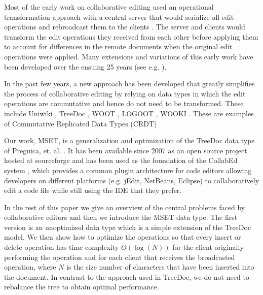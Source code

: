 \documentclass{amsart}
\begin{document}
Most of the early work on collaborative editing used an operational transformation approach with a central server that would serialize all edit operations  and rebroadcast them to the clients \cite{nichols_high-latency_1995}. The server and clients would transform the edit operations they received from each other before applying them to account for differences in the remote documents when the original edit operations were applied. Many extensions and variations of this early work have been developed over the ensuing 25 years (see e.g. \cite{sun_operational_2004}).

In the past few years, a new approach has been developed that greatly simplifies the process of collaborative editing by relying on data types in which the edit operations are commutative and hence do not need to be transformed. These include Uniwiki \cite{oster_building_2010, oster_uniwiki:_2009},  TreeDoc \cite{ letia_consistency_2010, preguica_commutative_2009}, WOOT \cite{oster_data_2006}, LOGOOT \cite{weiss_logoot:_2008, weiss_logoot:_2009, weiss_logoot-undo:_2010}, WOOKI \cite{weiss_wooki:_2007}. These are examples of Commutative Replicated Data Types (CRDT) \cite{preguica_commutative_2009}

Our work, MSET, is a generalization and optimization of the TreeDoc data type  of Preguica, et. al.  \cite{preguica_commutative_2009}. It has been available since 2007 as an open source project hosted at sourceforge \cite{granville_collabed_2007} and has been used as the foundation of the CollabEd system  \cite{granville_collabed:_2009}, which provides a common plugin architecture for code editors allowing developers on different platforms (e.g. jEdit, NetBeans, Eclipse) to collaboratively edit a code file while still using the IDE that they prefer.

In the rest of this paper we give an overview of the central problems faced by collaborative editors and then we introduce the MSET data type.  The first version is an unoptimized data type which is a simple extension of the TreeDoc model. We then show how to optimize the operations so that every insert or delete operation has time complexity $O(\log(N))$ for the client originally performing the operation and for each client that receives the broadcasted operation, where $N$ is the size number of characters that have been inserted into the document.  In contrast to the approach used in TreeDoc, we do not need to rebalance the tree to obtain optimal performance.
\end{document}
